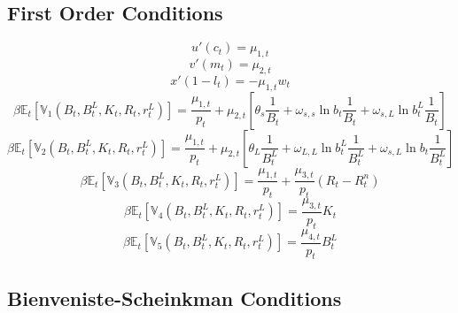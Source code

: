 \documentclass[11pt,a4paper,margin=1.5in]{article}
\begin{document}
\subsection{First Order Conditions}

\begin{equation}
	u'(c_t) = \mu_{1,t}
	\label{eq:HH_FOC_c}
\end{equation}
%
\begin{equation}
	v'\left(m_t\right) = \mu_{2,t}
	\label{eq:HH_FOC_M}
\end{equation}
%
\begin{equation}
	x'(1-l_t) = -\mu_{1,t}w_t
	\label{eq:HH_FOC_l}
\end{equation}
%
\begin{equation}
	\beta\mathbb{E}_t\!\left[\mathbb{V}\!_1\left(B_{t}, B^L_{t}, K_{t}, R_{t}, r^L_{t}\right)\right] = \frac{\mu_{1,t}}{p_t} + \mu_{2,t}\left[\theta_s\frac{1}{B_t} + \omega_{s,s}\ln b_t \frac{1}{B_t} + \omega_{s,L}\ln b^L_t \frac{1}{B_t}\right]
	\label{eq:HH_FOC_B}
\end{equation}
%
\begin{equation}
	\beta\mathbb{E}_t\!\left[\mathbb{V}\!_2\left(B_{t}, B^L_{t}, K_{t}, R_{t}, r^L_{t}\right)\right] = \frac{\mu_{1,t}}{p_t} + \mu_{2,t}\left[\theta_L\frac{1}{B^L_t} + \omega_{L,L}\ln b^L_t \frac{1}{B^L_t} + \omega_{s,L}\ln b_t \frac{1}{B^L_t}\right]
	\label{eq:HH_FOC_BL}
\end{equation}
%
\begin{equation}
	\beta\mathbb{E}_t\!\left[\mathbb{V}\!_3\left(B_{t}, B^L_{t}, K_{t}, R_{t}, r^L_{t}\right)\right] = \frac{\mu_{1,t}}{p_t} + \frac{\mu_{3,t}}{p_t}\left(R_t - R^{n}_t\right)
	\label{eq:HH_FOC_K}
\end{equation}
%
\begin{equation}
	\beta\mathbb{E}_t\!\left[\mathbb{V}\!_4\left(B_{t}, B^L_{t}, K_{t}, R_{t}, r^L_{t}\right)\right] = \frac{\mu_{3,t}}{p_t}K_t
	\label{eq:HH_FOC_R}
\end{equation}
%
\begin{equation}
	\beta\mathbb{E}_t\!\left[\mathbb{V}\!_5\left(B_{t}, B^L_{t}, K_{t}, R_{t}, r^L_{t}\right)\right] = \frac{\mu_{4,t}}{p_t}B^L_t
	\label{eq:HH_FOC_rL}
\end{equation}

\subsection{Bienveniste-Scheinkman Conditions}
\end{document}

